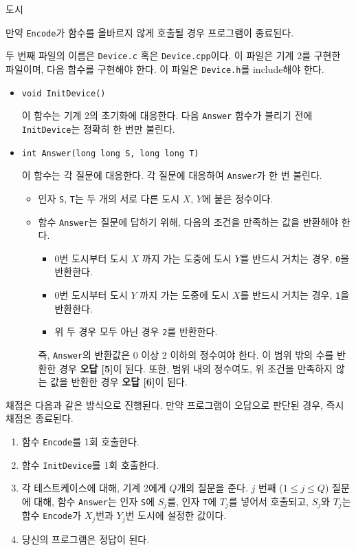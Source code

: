 \begin{problem}{도시}
\begin{itemize}
		만약 \texttt{Encode}가 함수를 올바르지 않게 호출될 경우 프로그램이 종료된다.
		
	\end{itemize}
	
	두 번째 파일의 이름은 \texttt{Device.c} 혹은 \texttt{Device.cpp}이다. 이 파일은 기계 2를 구현한 파일이며, 다음 함수를 구현해야 한다. 이 파일은 \texttt{Device.h}를 include해야 한다.
	
	
	\begin{itemize}
		\item \texttt{void InitDevice()}
		
		이 함수는 기계 2의 초기화에 대응한다. 다음 \texttt{Answer} 함수가 불리기 전에 \texttt{InitDevice}는 정확히 한 번만 불린다.
		
		\item \texttt{int Answer(long long S, long long T)}
		
		이 함수는 각 질문에 대응한다. 각 질문에 대응하여 \texttt{Answer}가 한 번 불린다.

		\begin{itemize}
			\item 인자 \texttt{S}, \texttt{T}는 두 개의 서로 다른 도시 $X$, $Y$에 붙은 정수이다.
			\item 함수 \texttt{Answer}는 질문에 답하기 위해, 다음의 조건을 만족하는 값을 반환해야 한다.
			
			\begin{itemize}
				\item 0번 도시부터 도시 $X$ 까지 가는 도중에 도시 $Y$를 반드시 거치는 경우, \texttt{0}을 반환한다.
				\item 0번 도시부터 도시 $Y$ 까지 가는 도중에 도시 $X$를 반드시 거치는 경우, \texttt{1}을 반환한다.
				\item 위 두 경우 모두 아닌 경우 \texttt{2}를 반환한다.
			\end{itemize}
		
			즉, \texttt{Answer}의 반환값은 0 이상 2 이하의 정수여야 한다. 이 범위 밖의 수를 반환한 경우 \textbf{오답 [5]}이 된다. 또한, 범위 내의 정수여도, 위 조건을 만족하지 않는 값을 반환한 경우 \textbf{오답 [6]}이 된다.
		
		\end{itemize}
	
	\end{itemize}
	
	채점은 다음과 같은 방식으로 진행된다. 만약 프로그램이 오답으로 판단된 경우, 즉시 채점은 종료된다.
	
	\begin{enumerate}
		\item 함수 \texttt{Encode}를 1회 호출한다.
		\item 함수 \texttt{InitDevice}를 1회 호출한다.
		\item 각 테스트케이스에 대해, 기계 2에게 $Q$개의 질문을 준다. $j$ 번째 ($1 \le j \le Q$) 질문에 대해, 함수 \texttt{Answer}는 인자 \texttt{S}에 $S_j$를, 인자 \texttt{T}에 $T_j$를 넣어서 호출되고, $S_j$와 $T_j$는 함수 \texttt{Encode}가 $X_j$번과 $Y_j$번 도시에 설정한 값이다.
		\item 당신의 프로그램은 정답이 된다.
	\end{enumerate}
	

\end{problem}
